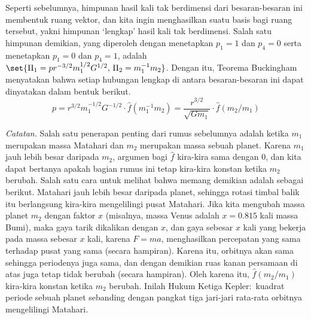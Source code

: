 Seperti sebelumnya,
himpunan hasil kali tak berdimensi dari besaran-besaran ini membentuk ruang vektor,
dan kita ingin menghasilkan suatu basis bagi ruang tersebut,
yakni himpunan `lengkap' hasil kali tak berdimensi.
Salah satu himpunan demikian, yang diperoleh dengan menetapkan $p_1=1$ dan $p_4=0$
serta menetapkan $p_1=0$ dan $p_4=1$, adalah
$\set{\Pi_1=pr^{-3/2}m_1^{1/2}G^{1/2},\,\Pi_2=m_1^{-1}m_2}$.
Dengan itu, Teorema Buckingham menyatakan bahwa
setiap hubungan lengkap di antara besaran-besaran ini dapat dinyatakan dalam bentuk berikut.
\begin{equation*}
  p = r^{3/2}m_1^{-1/2}G^{-1/2}\cdot\hat{f}(m_1^{-1}m_2)  
    = \frac{r^{3/2}}{\sqrt{Gm_1}}\cdot\hat{f}(m_2/m_1)
\end{equation*}

\textit{Catatan.}
Salah satu penerapan penting dari rumus sebelumnya adalah
ketika $m_1$ merupakan massa Matahari dan $m_2$ merupakan massa
sebuah planet.
Karena $m_1$ jauh lebih besar daripada $m_2$,
argumen bagi $\hat{f}$ kira-kira sama dengan $0$,
dan kita dapat bertanya apakah
bagian rumus ini tetap kira-kira konstan ketika $m_2$ berubah.
Salah satu cara untuk melihat bahwa memang demikian adalah sebagai berikut.
Matahari jauh lebih besar daripada planet,
sehingga rotasi timbal balik itu berlangsung kira-kira mengelilingi pusat Matahari.
Jika kita mengubah massa planet $m_2$ dengan faktor $x$
(misalnya, massa Venus adalah
$x=0.815$ kali massa Bumi),
maka gaya tarik dikalikan dengan $x$,
dan gaya sebesar $x$ kali yang bekerja pada massa sebesar $x$ kali,
karena $F=ma$, menghasilkan percepatan yang sama terhadap pusat yang sama
(secara hampiran).
Karena itu,
orbitnya akan sama sehingga periodenya juga sama,
dan dengan demikian ruas kanan persamaan di atas juga tetap tidak berubah
(secara hampiran).
Oleh karena itu,
$\hat{f}(m_2/m_1)$ kira-kira konstan ketika $m_2$ berubah.
Inilah Hukum Ketiga Kepler:~kuadrat
periode sebuah planet sebanding dengan pangkat tiga jari-jari rata-rata orbitnya
mengelilingi Matahari.

